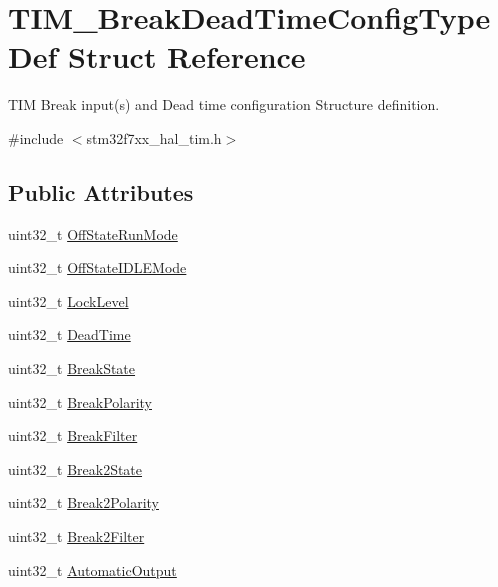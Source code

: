 \hypertarget{struct_t_i_m___break_dead_time_config_type_def}{}\section{T\+I\+M\+\_\+\+Break\+Dead\+Time\+Config\+Type\+Def Struct Reference}
\label{struct_t_i_m___break_dead_time_config_type_def}


T\+IM Break input(s) and Dead time configuration Structure definition.  




{\ttfamily \#include $<$stm32f7xx\+\_\+hal\+\_\+tim.\+h$>$}

\subsection*{Public Attributes}
\begin{DoxyCompactItemize}
\item 
uint32\+\_\+t \mbox{\hyperlink{struct_t_i_m___break_dead_time_config_type_def_a5e97751b5e397414e2a5120eb5cef7c6}{Off\+State\+Run\+Mode}}
\item 
uint32\+\_\+t \mbox{\hyperlink{struct_t_i_m___break_dead_time_config_type_def_a49f39e31ac019b9b7a20751bfd01c6c4}{Off\+State\+I\+D\+L\+E\+Mode}}
\item 
uint32\+\_\+t \mbox{\hyperlink{struct_t_i_m___break_dead_time_config_type_def_ab00ae9fa5c6daa6319883863dee6e40a}{Lock\+Level}}
\item 
uint32\+\_\+t \mbox{\hyperlink{struct_t_i_m___break_dead_time_config_type_def_a4bdc5aec84be4b728b55028491f261d4}{Dead\+Time}}
\item 
uint32\+\_\+t \mbox{\hyperlink{struct_t_i_m___break_dead_time_config_type_def_a8962430194b43ac28a14c96dd9cc44e6}{Break\+State}}
\item 
uint32\+\_\+t \mbox{\hyperlink{struct_t_i_m___break_dead_time_config_type_def_ae15ddbf3087f9a2129a52a1317339ea7}{Break\+Polarity}}
\item 
uint32\+\_\+t \mbox{\hyperlink{struct_t_i_m___break_dead_time_config_type_def_aad8158e694a62f6c071975ee4c2e5b6a}{Break\+Filter}}
\item 
uint32\+\_\+t \mbox{\hyperlink{struct_t_i_m___break_dead_time_config_type_def_ab9a983671c730c9b33852c9aa60846fb}{Break2\+State}}
\item 
uint32\+\_\+t \mbox{\hyperlink{struct_t_i_m___break_dead_time_config_type_def_af492d4b9f5e974abb51abe58d413cd17}{Break2\+Polarity}}
\item 
uint32\+\_\+t \mbox{\hyperlink{struct_t_i_m___break_dead_time_config_type_def_a3c90aabc31a34864525dad4bd3547c86}{Break2\+Filter}}
\item 
uint32\+\_\+t \mbox{\hyperlink{struct_t_i_m___break_dead_time_config_type_def_ae591f2368d0be5b77d8a746e73eabe71}{Automatic\+Output}}
\end{DoxyCompactItemize}


